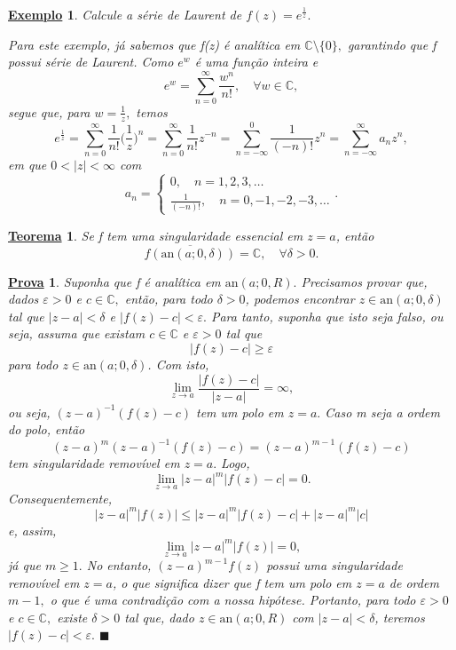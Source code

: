 \documentclass{article}
\newtheorem*{theorem*}{\underline{Teorema}}
\newtheorem{example}{\underline{Exemplo}}[section]
\newtheorem*{proof*}{\underline{Prova}}
\renewcommand\qedsymbol{$\blacksquare$}
\begin{document}
  \begin{example}
    Calcule a série de Laurent de \(f(z) = e^{\frac{1}{z}}.\)

    Para este exemplo, já sabemos que f(z) é analítica em \(\mathbb{C}\setminus{\{0\}},\) garantindo que f possui série de Laurent.
Como \(e^{w}\) é uma função inteira e 
  \[
    e^{w} = \sum\limits_{n=0}^{\infty}\frac{w^{n}}{n!},\quad \forall w\in \mathbb{C},
  \]
segue que, para \(w = \frac{1}{z},\) temos 
  \[
    e^{\frac{1}{z}}=\sum\limits_{n=0}^{\infty}\frac{1}{n!}\biggl(\frac{1}{z}\biggr)^{n} = \sum\limits_{n=0}^{\infty}\frac{1}{n!}z^{-n} = \sum\limits_{n=-\infty}^{0}\frac{1}{(-n)!}z^{n} = \sum\limits_{n=-\infty}^{\infty}a_{n}z^{n},
  \]
em que \(0 < |z| < \infty\) com 
  \[
    a_{n}  = \left\{\begin{array}{ll}
        0,\quad n=1, 2, 3,\dotsc \\
        \frac{1}{(-n)!},\quad n = 0, -1, -2, -3, \dotsc 
      \end{array}\right. .
  \]
  \end{example}
  \hypertarget{casorati-weierstrass}{
 \begin{theorem*}
   Se f tem uma singularidade essencial em \(z=a\), então 
     \[
       \overline{f(\mathrm{an}(a; 0, \delta ))} = \mathbb{C},\quad \forall \delta > 0.
     \]
 \end{theorem*}}
\begin{proof*}
  Suponha que f é analítica em \(\mathrm{an}(a; 0, R).\) Precisamos provar que, dados \(\varepsilon > 0\) e \(c\in \mathbb{C},\) então, para todo \(\delta >0\),
podemos encontrar \(z\in \mathrm{an}(a; 0, \delta )\) tal que \(|z-a| < \delta \) e \(|f(z) - c| < \varepsilon .\) Para tanto, suponha que isto seja falso, ou seja, assuma que existam
 \(c\in \mathbb{C}\) e \(\varepsilon > 0\) tal que 
   \[
     |f(z) - c| \geq \varepsilon 
   \]
  para todo \(z\in \mathrm{an}(a; 0, \delta )\). Com isto,
    \[
      \lim_{z\to a}\frac{|f(z)-c|}{|z-a|} = \infty,
    \]
  ou seja, \((z-a)^{-1}(f(z)-c)\) tem um polo em \(z=a.\) Caso m seja a ordem do polo, então 
    \[
      (z-a)^{m}(z-a)^{-1}(f(z)-c) = (z-a)^{m-1}(f(z)-c)
    \]
  tem singularidade removível em \(z=a.\) Logo, 
    \[
      \lim_{z\to a}|z-a|^{m}|f(z)-c| = 0.
    \]
  Consequentemente,
    \[
      |z-a|^{m}|f(z)|\leq |z-a|^{m}|f(z)-c| + |z-a|^{m}|c|
    \]
  e, assim,
    \[
      \lim_{z\to a}|z-a|^{m}|f(z)| = 0,
    \]
  já que \(m\geq 1.\) No entanto, \((z-a)^{m-1}f(z)\) possui uma singularidade removível em \(z=a\), o que significa dizer que 
f tem um polo em \(z=a\) de ordem \(m-1,\) o que é uma contradição com a nossa hipótese. Portanto, para todo \(\varepsilon >0\) e \(c\in \mathbb{C},\)
existe \(\delta > 0\) tal que, dado \(z\in \mathrm{an}(a; 0, R)\) com \(|z-a| < \delta \), teremos \(|f(z) - c| < \varepsilon .\) \qedsymbol
\end{proof*}
  \newpage
\end{document}
